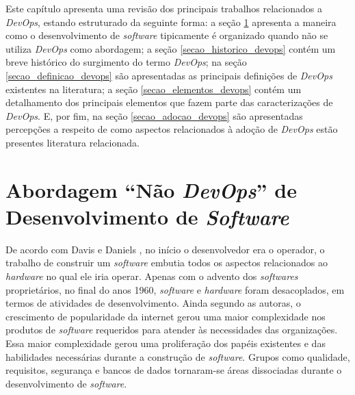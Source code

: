 \newcommand{\texCommand}[1]{\texttt{\textbackslash{#1}}}%

\newcommand{\exemplo}[1]{%
\vspace{\baselineskip}%
\noindent\fbox{\begin{minipage}{\textwidth}#1\end{minipage}}%
\\\vspace{\baselineskip}}%

\newcommand{\exemploVerbatim}[1]{%
\vspace{\baselineskip}%
\noindent\fbox{\begin{minipage}{\textwidth}%
#1\end{minipage}}%
\\\vspace{\baselineskip}}%

Este capítulo apresenta uma revisão dos principais trabalhos relacionados a
\textit{DevOps}, estando estruturado da seguinte forma: a seção \ref{secao_abordagem_nao_devops}
apresenta a maneira como o desenvolvimento de \textit{software} tipicamente é
organizado quando não se utiliza \textit{DevOps} como abordagem; a seção \ref{secao_historico_devops}
contém um breve histórico do surgimento do termo \textit{DevOps}; na seção
\ref{secao_definicao_devops} são apresentadas as principais definições de
\textit{DevOps} existentes na literatura; a seção \ref{secao_elementos_devops}
contém um detalhamento dos principais elementos que fazem parte das caracterizações
de \textit{DevOps}. E, por fim, na seção \ref{secao_adocao_devops}
são apresentadas percepções a respeito de como aspectos relacionados à adoção
de \textit{DevOps} estão presentes literatura relacionada.

\section{Abordagem ``Não \textit{DevOps}'' de Desenvolvimento de \textit{Software}}
\label{secao_abordagem_nao_devops}

De acordo com Davis e Daniels \cite{effective_devops}, no início o desenvolvedor
era o operador, o trabalho de construir um \textit{software} embutia todos
os aspectos relacionados ao \textit{hardware} no qual ele iria operar. Apenas
com o advento dos \textit{softwares} proprietários, no final do anos 1960,
\textit{software} e \textit{hardware} foram desacoplados, em termos de atividades
de desenvolvimento. Ainda segundo as autoras, o crescimento de popularidade da
internet gerou uma maior complexidade nos produtos de \textit{software}
requeridos para atender às necessidades das organizações. Essa maior
complexidade gerou uma proliferação dos papéis existentes e das habilidades
necessárias durante a construção de \textit{software}. Grupos como qualidade,
requisitos, segurança e bancos de dados tornaram-se áreas dissociadas durante o
desenvolvimento de \textit{software}.

